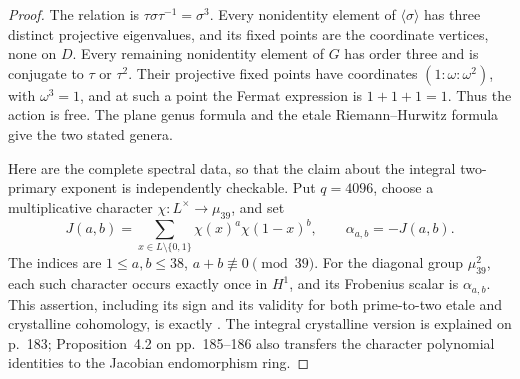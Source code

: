 \begin{proof}
The relation is \(\tau\sigma\tau^{-1}=\sigma^3\).
Every nonidentity element of \(\langle\sigma\rangle\)
has three distinct projective eigenvalues, and its fixed
points are the coordinate vertices, none on \(D\).
Every remaining nonidentity element of \(G\) has order
three and is conjugate to \(\tau\) or \(\tau^2\).
Their projective fixed points have coordinates
\((1:\omega:\omega^2)\), with \(\omega^3=1\),
and at such a point the Fermat expression is
\(1+1+1=1\). Thus the action is free.
The plane genus formula and the etale Riemann--Hurwitz
formula give the two stated genera.

Here are the complete spectral data, so that the claim
about the integral two-primary exponent is independently
checkable. Put \(q=4096\), choose a multiplicative
character \(\chi:L^\times\to\mu_{39}\), and set
\[
 J(a,b)=\sum_{x\in L\setminus\{0,1\}}
                   \chi(x)^a\chi(1-x)^b,
 \qquad \alpha_{a,b}=-J(a,b).
\]
The indices are \(1\le a,b\le38\), \(a+b\not\equiv0\pmod{39}\).
For the diagonal group \(\mu_{39}^2\), each such character
occurs exactly once in \(H^1\), and its Frobenius scalar is
\(\alpha_{a,b}\). This assertion, including its sign and its
validity for both prime-to-two etale and crystalline cohomology,
is exactly \cite[Corollary~2.4, p.~181]{AC_Katz1981}.
The integral crystalline version is explained on p.~183;
Proposition~4.2 on pp.~185--186 also transfers the character
polynomial identities to the Jacobian endomorphism ring.


\end{proof}
